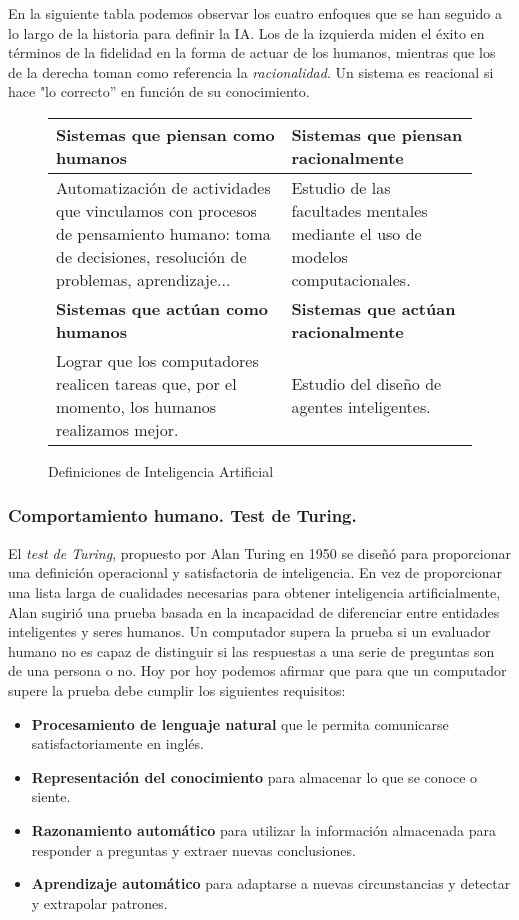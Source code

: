 \documentclass[12pt,spanish]{article}
\numberwithin{definition}{subsection}
\begin{document}
En la siguiente tabla podemos observar los cuatro enfoques que se han seguido a lo largo de la historia para definir la IA. Los de la izquierda miden el éxito en términos de la fidelidad en la forma de actuar de los humanos, mientras que los de la derecha toman como referencia la \emph{racionalidad}. Un sistema es reacional si hace "lo correcto'' en función de su conocimiento.
\begin{figure}[H]
\centering
\begin{tabular}{|m{7.5cm}|m{7.5cm}|}
\hline
\textbf{Sistemas que piensan como humanos} & \textbf{Sistemas que piensan racionalmente}\\
\hline
Automatización de actividades que vinculamos con procesos de pensamiento humano: toma de decisiones, resolución de problemas, aprendizaje... & Estudio de las facultades mentales mediante el uso de modelos computacionales.\\
\hline
\textbf{Sistemas que actúan como humanos} &\textbf{Sistemas que actúan racionalmente}\\
\hline
Lograr que los computadores realicen tareas que, por el momento, los humanos realizamos mejor. & Estudio del diseño de agentes inteligentes. \\
\hline
\end{tabular}
\caption{Definiciones de Inteligencia Artificial}
\end{figure}

\subsubsection{Comportamiento humano. Test de Turing.}

El \emph{test de Turing}, propuesto por Alan Turing en 1950 se diseñó para proporcionar una definición operacional y satisfactoria de inteligencia. En vez de proporcionar una lista larga de cualidades necesarias para obtener inteligencia artificialmente, Alan sugirió una prueba basada en la incapacidad de diferenciar entre entidades inteligentes y seres humanos. Un computador supera la prueba si un evaluador humano no es capaz de distinguir si las respuestas a una serie de preguntas son de una persona o no. Hoy por hoy podemos afirmar que para que un computador supere la prueba debe cumplir los siguientes requisitos:
\begin{itemize}
	\item \textbf{Procesamiento de lenguaje natural} que le permita comunicarse satisfactoriamente en inglés.
	\item \textbf{Representación del conocimiento} para almacenar lo que se conoce o siente.
	\item \textbf{Razonamiento automático} para utilizar la información almacenada para responder a preguntas y extraer nuevas conclusiones.
	\item \textbf{Aprendizaje automático} para adaptarse a nuevas circunstancias y detectar y extrapolar patrones.
\end{itemize}
\end{document}
